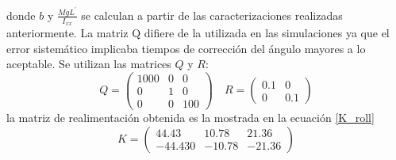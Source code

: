 \documentclass[main]{subfiles}
\begin{document}
donde $b$ y $\frac{MgL^\prime}{I_{xx}}$ se calculan a partir de las caracterizaciones realizadas anteriormente. La matriz Q difiere de la utilizada en las simulaciones ya que el error sistem\'atico implicaba tiempos de correcci\'on del \'angulo mayores a lo aceptable. Se utilizan las matrices $Q$ y $R$:
\begin{equation}
\label{eq:Q_R_roll}
Q = \left(\begin{array}{ccc}
1000 & 0 & 0\\
0 & 1 & 0\\
0 & 0 & 100 
\end{array} \right) \quad R =\left(\begin{array}{cc}
0.1 & 0 \\
0 & 0.1
\end{array}\right)
\end{equation}
la matriz de realimentaci\'on obtenida es la mostrada en la ecuación \ref{K_roll}
\begin{equation}
\label{K_roll}
K = \left( \begin{array}{ccc}
44.43 & 10.78 &21.36\\
-44.430 & -10.78 &-21.36
\end{array}\right)
\end{equation}
\end{document}
